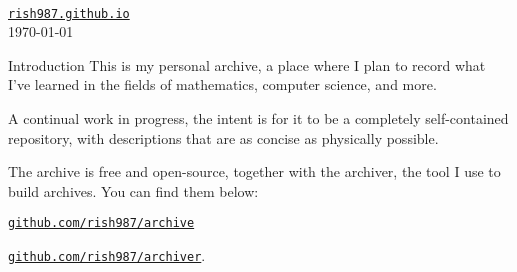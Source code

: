 \begin{center}
  \nrp
  {\LARGE {}}\\
  \vspace{10pt}
  \large 
  \href{https://rish987.github.io/}{\tt {rish987.github.io}}\\
  \vspace{7pt}
  \today
\end{center}
\begin{part}{Introduction}
  \nrp
  This is my personal archive,
  a place where I plan to record
  what I've learned in the fields of 
  mathematics, computer science, and more.

  A continual work in progress, the intent is 
  for it to be a completely self-contained repository,
  with descriptions that are as concise as physically possible.

  The archive is free and open-source, 
  together with the archiver, the tool I use to build archives.
  You can find them below:

  \href{https://github.com/rish987/archive}{\tt github.com/rish987/archive}

  \href{https://github.com/rish987/archiver}{\tt github.com/rish987/archiver}.

\end{part}

